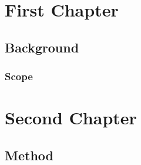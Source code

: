 \documentclass[degree=master, academic=true, fontset=fandol]{nwputhesis}
\begin{document}
\START
\showoutput

\frontmatter
\tableofcontents

\mainmatter
\chapter{First Chapter}
\section{Background}
\subsection{Scope}

\chapter{Second Chapter}
\section{Method}

\clearpage
\OMIT
\end{document}
